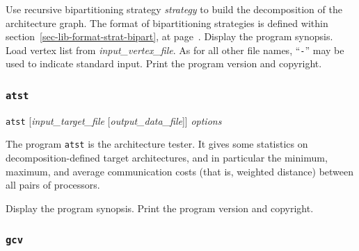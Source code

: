 \begin{itemize}
\progopt
\begin{itemize}
Use recursive bipartitioning strategy {\it strategy\/} to build the
decomposition of the architecture graph. The format of bipartitioning
strategies is defined within section~\ref{sec-lib-format-strat-bipart},
at page~\pageref{sec-lib-format-strat-bipart}.
\iteme[\texttt{-h}]
Display the program synopsis.
Load vertex list from {\it input\_vertex\_file}. As for all other file names,
``\texttt{-}'' may be used to indicate standard input.
\iteme[\texttt{-V}]
Print the program version and copyright.
\end{itemize}
\end{itemize}

\subsubsection{\texttt{atst}}

\begin{itemize}
\progsyn
\texttt{atst} [{\it input\_target\_file} [{\it output\_data\_file}]] {\it options}

\progdes
The program \texttt{atst} is the architecture tester. It gives some statistics on
decomposition-defined target architectures, and in particular the
minimum, maximum, and average communication costs (that is, weighted distance)
between all pairs of processors.

\progopt
\begin{itemize}
\iteme[\texttt{-h}]
Display the program synopsis.
\iteme[\texttt{-V}]
Print the program version and copyright.
\end{itemize}
\end{itemize}

\subsubsection{\texttt{gcv}}
\label{sec-prog-gcv}

